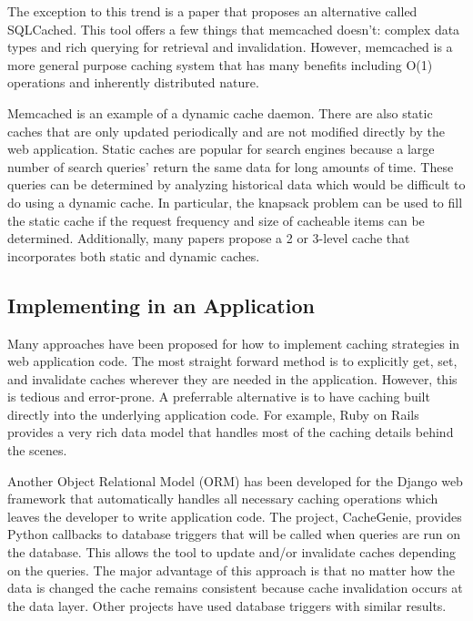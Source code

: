 \documentclass[12pt]{article}
\begin{document}
The exception to this trend is a paper that proposes an alternative called SQLCached.\cite{sqlCached}
This tool offers a few things that memcached doesn't: complex data types and rich querying for retrieval and invalidation.
However, memcached is a more general purpose caching system that has many benefits including O(1) operations and inherently distributed nature.\cite{memcachedDotOrg}

Memcached is an example of a dynamic cache daemon.
There are also static caches that are only updated periodically and are not modified directly by the web application.
Static caches are popular for search engines because a large number of search queries' return the same data for long amounts of time.
These queries can be determined by analyzing historical data which would be difficult to do using a dynamic cache.\cite{designTradeOffsSearchEngine}
In particular, the knapsack problem can be used to fill the static cache if the request frequency and size of cacheable items can be determined.\cite{designTradeOffsSearchEngine}
Additionally, many papers propose a 2 or 3-level cache that incorporates both static and dynamic caches.\cite{cacheAdmissionPolicies}\cite{designTradeOffsSearchEngine}

\subsection{Implementing in an Application}
Many approaches have been proposed for how to implement caching strategies in web application code.
The most straight forward method is to explicitly get, set, and invalidate caches wherever they are needed in the application.
However, this is tedious and error-prone.\cite{keyBasedCacheExpiration}\cite{triggerBasedORM}
A preferrable alternative is to have caching built directly into the underlying application code.
For example, Ruby on Rails provides a very rich data model that handles most of the caching details behind the scenes.\cite{keyBasedCacheExpiration}

Another Object Relational Model (ORM) has been developed for the Django web framework that automatically handles all necessary caching operations which leaves the developer to write application code.\cite{triggerBasedORM}
The project, CacheGenie, provides Python callbacks to database triggers that will be called when queries are run on the database. This allows the tool to update and/or invalidate caches depending on the queries.
The major advantage of this approach is that no matter how the data is changed the cache remains consistent because cache invalidation occurs at the data layer.
Other projects have used database triggers with similar results.\cite{scalableConsistentCaching}
\end{document}
